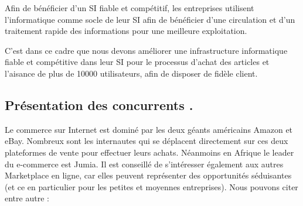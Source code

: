 Afin de bénéficier d’un SI fiable et compétitif, les entreprises utilisent l’informatique comme socle de leur SI afin de bénéficier d’une circulation et d’un traitement rapide des informations pour une meilleure exploitation.

C’est dans ce cadre que nous devons améliorer une infrastructure informatique fiable et compétitive dans leur SI pour le processus d’achat des articles et l’aisance de plus de 10000 utilisateurs, afin de disposer de fidèle client.

\subsection{Présentation des concurrents .}

Le commerce sur Internet est dominé par les deux géants américains Amazon et eBay. Nombreux sont les internautes qui se déplacent directement sur ces deux plateformes de vente pour effectuer leurs achats. Néanmoins en Afrique le leader du e-commerce est Jumia. Il est conseillé de s’intéresser également aux autres Marketplace en ligne, car elles peuvent représenter des opportunités séduisantes (et ce en particulier pour les petites et moyennes entreprises). Nous pouvons citer entre autre :

